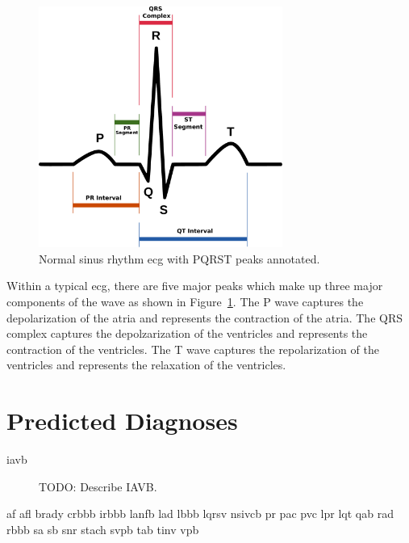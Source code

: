 \documentclass[\main/thesis.tex]{subfiles}
\begin{document}
\begin{figure}[ht]
    \centering
    \includegraphics[width=8cm]{figure/PQRST_NormalSinusRhythm.pdf}
    \caption[Normal sinus rhythm \gls{ecg} with PQRST peaks annotated.]{Normal sinus rhythm \gls{ecg} with PQRST peaks annotated.}
    \label{fig:pqrst_nsr}
\end{figure}

Within a typical \gls{ecg}, there are five major peaks which make up three major components of the wave as shown in Figure~\ref{fig:pqrst_nsr}.
The P wave captures the depolarization of the atria and represents the contraction of the atria.
The QRS complex captures the depolzarization of the ventricles and represents the contraction of the ventricles.
The T wave captures the repolarization of the ventricles and represents the relaxation of the ventricles.


\section{Predicted Diagnoses}

\begin{description}
    \item[\gls{iavb}] TODO: Describe IAVB.
\end{description}

\gls{af}
\gls{afl}
\gls{brady}
\gls{crbbb}
\gls{irbbb}
\gls{lanfb}
\gls{lad}
\gls{lbbb}
\gls{lqrsv}
\gls{nsivcb}
\gls{pr}
\gls{pac}
\gls{pvc}
\gls{lpr}
\gls{lqt}
\gls{qab}
\gls{rad}
\gls{rbbb}
\gls{sa}
\gls{sb}
\gls{snr}
\gls{stach}
\gls{svpb}
\gls{tab}
\gls{tinv}
\gls{vpb}


\end{document}
